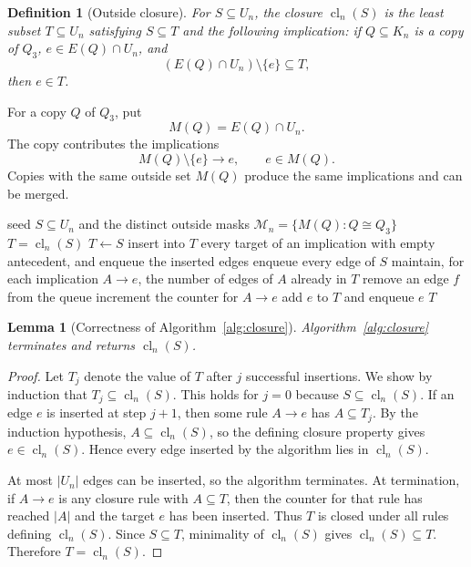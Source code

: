 \documentclass[11pt]{article}
\numberwithin{equation}{section}
\newtheorem{lemma}[theorem]{Lemma}
\newtheorem{definition}[theorem]{Definition}
\newcommand{\cl}{\operatorname{cl}}
\begin{document}
\begin{definition}[Outside closure]\label{def:closure}
For $S\subseteq U_n$, the closure $\cl_n(S)$ is the least subset $T\subseteq U_n$ satisfying $S\subseteq T$ and the following implication: if $Q\subseteq K_n$ is a copy of $Q_3$, $e\in E(Q)\cap U_n$, and
\[
(E(Q)\cap U_n)\setminus\{e\}\subseteq T,
\]
then $e\in T$.
\end{definition}

For a copy $Q$ of $Q_3$, put
\[
M(Q)=E(Q)\cap U_n.
\]
The copy contributes the implications
\[
M(Q)\setminus\{e\}\longrightarrow e,
\qquad e\in M(Q).
\tag{3.2}
\]
Copies with the same outside set $M(Q)$ produce the same implications and can be merged.

\begin{algorithm}[t]
\caption{Exact closure computation}
\label{alg:closure}
\begin{algorithmic}[1]
\Require seed $S\subseteq U_n$ and the distinct outside masks $\mathcal M_n=\{M(Q):Q\cong Q_3\}$
\Ensure $T=\cl_n(S)$
\State $T\gets S$
\State insert into $T$ every target of an implication with empty antecedent, and enqueue the inserted edges
\State enqueue every edge of $S$
\State maintain, for each implication $A\to e$, the number of edges of $A$ already in $T$
    \State remove an edge $f$ from the queue
        \State increment the counter for $A\to e$
            \State add $e$ to $T$ and enqueue $e$
        \EndIf
    \EndFor
\EndWhile
\State \Return $T$
\end{algorithmic}
\end{algorithm}

\begin{lemma}[Correctness of Algorithm~\ref{alg:closure}]\label{lem:closure}
Algorithm~\ref{alg:closure} terminates and returns $\cl_n(S)$.
\end{lemma}

\begin{proof}
Let $T_j$ denote the value of $T$ after $j$ successful insertions. We show by
induction that $T_j\subseteq\cl_n(S)$. This holds for $j=0$ because
$S\subseteq\cl_n(S)$. If an edge $e$ is inserted at step $j+1$, then some
rule $A\to e$ has $A\subseteq T_j$. By the induction hypothesis,
$A\subseteq\cl_n(S)$, so the defining closure property gives
$e\in\cl_n(S)$. Hence every edge inserted by the algorithm lies in
$\cl_n(S)$.

At most $|U_n|$ edges can be inserted, so the algorithm terminates. At
termination, if $A\to e$ is any closure rule with $A\subseteq T$, then the
counter for that rule has reached $|A|$ and the target $e$ has been inserted.
Thus $T$ is closed under all rules defining $\cl_n(S)$. Since $S\subseteq T$,
minimality of $\cl_n(S)$ gives $\cl_n(S)\subseteq T$. Therefore
$T=\cl_n(S)$.
\end{proof}
\end{document}
